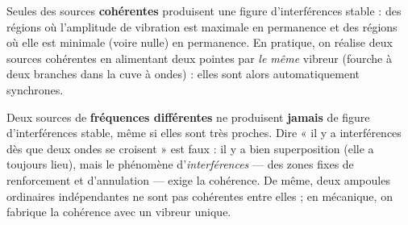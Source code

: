 \documentclass[11pt]{article}
\newcommand{\cle}[1]{{\popxbold\color{popdark}#1}}
\begin{document}
\begin{propriete}
Seules des sources \textbf{cohérentes} produisent une \cle{figure d'interférences stable} : des régions où l'amplitude de vibration est maximale en permanence et des régions où elle est minimale (voire nulle) en permanence. En pratique, on réalise deux sources cohérentes en alimentant deux pointes par \emph{le même} vibreur (fourche à deux branches dans la cuve à ondes) : elles sont alors automatiquement synchrones.
\end{propriete}

\begin{attention}
Deux sources de \textbf{fréquences différentes} ne produisent \textbf{jamais} de figure d'interférences stable, même si elles sont très proches. Dire « il y a interférences dès que deux ondes se croisent » est faux : il y a bien superposition (elle a toujours lieu), mais le phénomène d'\emph{interférences} — des zones fixes de renforcement et d'annulation — exige la cohérence. De même, deux ampoules ordinaires indépendantes ne sont pas cohérentes entre elles ; en mécanique, on fabrique la cohérence avec un vibreur unique.
\end{attention}
\end{document}
